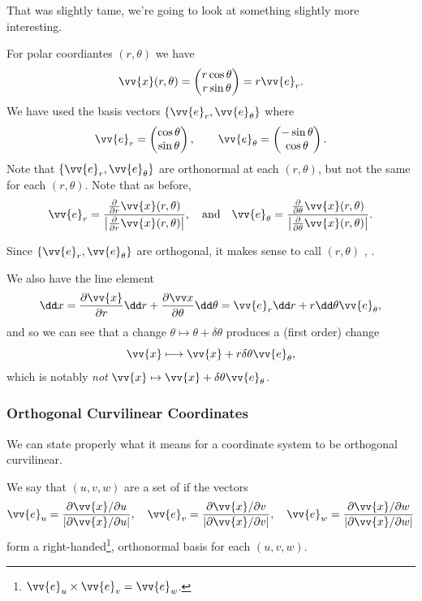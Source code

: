 That was slightly tame, we're going to look at something slightly more interesting.

\begin{example}
	For polar coordiantes $(r, \theta)$ we have
	$$
\vv{x}(r, \theta) = \begin{pmatrix}
	r \cos \theta \\
	r \sin \theta
\end{pmatrix} = r \vv{e}_r.
	$$
	We have used the basis vectors $\{\vv{e}_r, \vv{e}_\theta\}$ where
	$$
\vv{e}_r = \begin{pmatrix}
	\cos \theta \\ \sin \theta
\end{pmatrix}, \quad \quad \vv{e}_\theta = \begin{pmatrix}
	- \sin  \theta \\ \cos \theta
\end{pmatrix}.
$$
Note that $\{\vv{e}_r, \vv{e}_\theta\}$ are orthonormal at each $(r, \theta)$, but not the same for each $(r, \theta)$. Note that as before, 
$$\vv{e}_r = \frac{\frac{\partial}{\partial r} \vv{x}(r, \theta)}{\left|\frac{\partial}{\partial r} \vv{x}(r, \theta)\right|}, \quad \text{and} \quad 
\vv{e}_\theta = \frac{\frac{\partial}{\partial \theta} \vv{x}(r, \theta)}{\left|\frac{\partial}{\partial \theta} \vv{x}(r, \theta)\right|}.$$

Since $\{\vv{e}_r, \vv{e}_\theta\}$ are orthogonal, it makes sense to call $(r, \theta)$ , .

We also have the line element
$$
\dd x = \frac{\partial \vv{x}}{\partial r} \dd r + \frac{\partial \vv x}{\partial \theta} \dd \theta = \vv{e}_r \dd r + r \dd \theta \vv {e}_\theta,
$$
and so we can see that a change $\theta \mapsto \theta + \delta \theta$ produces a (first order) change
$$
\vv{x} \longmapsto \vv{x} + r \delta \theta \vv{e}_\theta,
$$
which is notably \emph{not} $\vv{x} \mapsto \vv{x} + \delta \theta \vv{e}_\theta$.
\end{example}

\subsubsection{Orthogonal Curvilinear Coordinates}

We can state properly what it means for a coordinate system to be orthogonal curvilinear.

\begin{definition}
	We say that $(u, v, w)$ are a set of  if the vectors
	$$
	\vv{e}_u = \frac{\partial \vv{x} / \partial u}{|\partial \vv{x} / \partial u|}, \quad \vv{e}_v = \frac{\partial \vv{x} / \partial v}{|\partial \vv{x} / \partial v|}, \quad \vv{e}_w = \frac{\partial \vv{x} / \partial w}{|\partial \vv{x} / \partial w|}
	$$
	form a right-handed\footnote{$\vv{e}_u \times \vv{e}_v = \vv{e}_w$.}, orthonormal basis for each $(u, v, w)$.
\end{definition}

